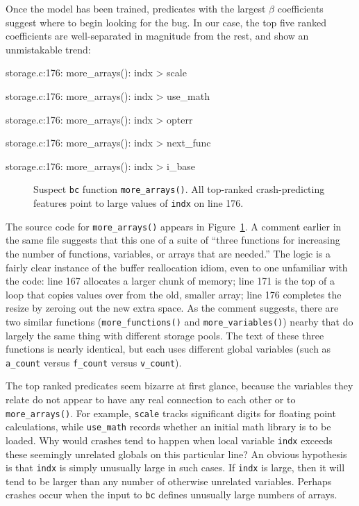 Once the model has been trained, predicates with the largest $\beta$
coefficients suggest where to begin looking for the bug.  In our case,
the top five ranked coefficients are well-separated in magnitude from
the rest, and show an unmistakable trend:

\begin{features}
\item storage.c:176: more\_arrays(): indx > scale
\item storage.c:176: more\_arrays(): indx > use\_math
\item storage.c:176: more\_arrays(): indx > opterr
\item storage.c:176: more\_arrays(): indx > next\_func
\item storage.c:176: more\_arrays(): indx > i\_base
\end{features}

\begin{figure}
  \centering
  \caption{Suspect \texttt{bc} function \texttt{more\_arrays()}.  All
  top-ranked crash-predicting features point to large values of
  \texttt{indx} on line 176.}
  \label{fig:bc:more-arrays}
\end{figure}

The source code for \texttt{more\_arrays()} appears in
Figure~\ref{fig:bc:more-arrays}.  A comment earlier in the same file
suggests that this one of a suite of ``three functions for increasing
the number of functions, variables, or arrays that are needed.''  The
logic is a fairly clear instance of the buffer reallocation idiom,
even to one unfamiliar with the code: line 167 allocates a larger
chunk of memory; line 171 is the top of a loop that copies values over
from the old, smaller array; line 176 completes the resize by zeroing
out the new extra space.  As the comment suggests, there are two
similar functions (\texttt{more\_functions()} and
\texttt{more\_variables()}) nearby that do largely the same thing with
different storage pools.  The text of these three functions is nearly
identical, but each uses different global variables (such as
\texttt{a\_count} versus \texttt{f\_count} versus \texttt{v\_count}).

The top ranked predicates seem bizarre at first glance, because the
variables they relate do not appear to have any real connection to
each other or to \texttt{more\_arrays()}.  For example, \texttt{scale}
tracks significant digits for floating point calculations, while
\texttt{use\_math} records whether an initial math library is to be
loaded.  Why would crashes tend to happen when local variable
\texttt{indx} exceeds these seemingly unrelated globals on this
particular line?  An obvious hypothesis is that \texttt{indx} is
simply unusually large in such cases.  If \texttt{indx} is large, then
it will tend to be larger than any number of otherwise unrelated
variables.  Perhaps crashes occur when the input to \texttt{bc}
defines unusually large numbers of arrays.


